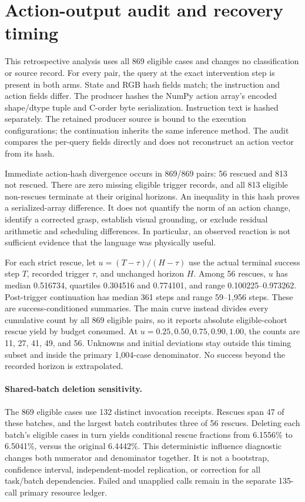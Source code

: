 \section{Action-output audit and recovery timing}
\label{s:dynamics}
This retrospective analysis uses all 869 eligible cases and changes no classification or source record. For every pair, the query at the exact intervention step is present in both arms. State and RGB hash fields match; the instruction and action fields differ. The producer hashes the NumPy action array's encoded shape/dtype tuple and C-order byte serialization. Instruction text is hashed separately. The retained producer source is bound to the execution configurations; the continuation inherits the same inference method. The audit compares the per-query fields directly and does not reconstruct an action vector from its hash.

Immediate action-hash divergence occurs in 869/869 pairs: 56 rescued and 813 not rescued. There are zero missing eligible trigger records, and all 813 eligible non-rescues terminate at their original horizons. An inequality in this hash proves a serialized-array difference. It does not quantify the norm of an action change, identify a corrected grasp, establish visual grounding, or exclude residual arithmetic and scheduling differences. In particular, an observed reaction is not sufficient evidence that the language was physically useful.

For each strict rescue, let $u=(T-\tau)/(H-\tau)$ use the actual terminal success step $T$, recorded trigger $\tau$, and unchanged horizon $H$. Among 56 rescues, $u$ has median 0.516734, quartiles 0.304516 and 0.774101, and range 0.100225--0.973262. Post-trigger continuation has median 361 steps and range 59--1,956 steps. These are success-conditioned summaries. The main curve instead divides every cumulative count by all 869 eligible pairs, so it reports absolute eligible-cohort rescue yield by budget consumed. At $u=0.25,0.50,0.75,0.90,1.00$, the counts are 11, 27, 41, 49, and 56. Unknowns and initial deviations stay outside this timing subset and inside the primary 1,004-case denominator. No success beyond the recorded horizon is extrapolated.

\paragraph{Shared-batch deletion sensitivity.}
The 869 eligible cases use 132 distinct invocation receipts. Rescues span 47 of these batches, and the largest batch contributes three of 56 rescues. Deleting each batch's eligible cases in turn yields conditional rescue fractions from 6.1556\% to 6.5041\%, versus the original 6.4442\%. This deterministic influence diagnostic changes both numerator and denominator together. It is not a bootstrap, confidence interval, independent-model replication, or correction for all task/batch dependencies. Failed and unapplied calls remain in the separate 135-call primary resource ledger.
